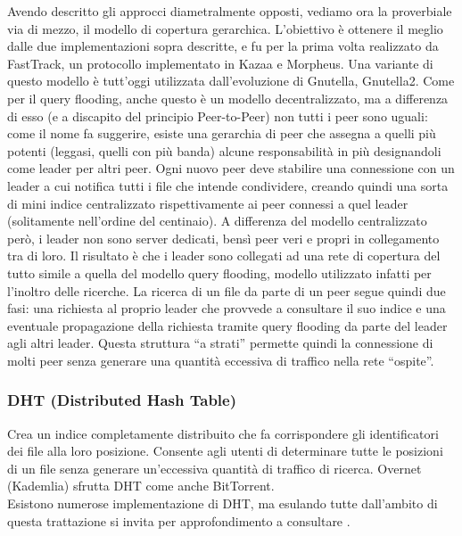 Avendo descritto gli approcci diametralmente opposti, vediamo ora la proverbiale via di mezzo, il modello di copertura gerarchica. L'obiettivo è ottenere il meglio dalle due implementazioni sopra descritte, e fu per la prima volta realizzato da FastTrack, un protocollo implementato in Kazaa e Morpheus. Una variante di questo modello è tutt'oggi utilizzata dall'evoluzione di Gnutella, Gnutella2. Come per il query flooding, anche questo è un modello decentralizzato, ma a differenza di esso (e a discapito del principio Peer-to-Peer) non tutti i peer sono uguali: come il nome fa suggerire, esiste una gerarchia di peer che assegna a quelli più potenti (leggasi, quelli con più banda) alcune responsabilità in più designandoli come leader per altri peer. Ogni nuovo peer deve stabilire una connessione con un leader a cui notifica tutti i file che intende condividere, creando quindi una sorta di mini indice centralizzato rispettivamente ai peer connessi a quel leader (solitamente nell'ordine del centinaio). A differenza del modello centralizzato però, i leader non sono server dedicati, bensì peer veri e propri in collegamento tra di loro. Il risultato è che i leader sono collegati ad una rete di copertura del tutto simile a quella del modello query flooding, modello utilizzato infatti per l'inoltro delle ricerche. La ricerca di un file da parte di un peer segue quindi due fasi: una richiesta al proprio leader che provvede a consultare il suo indice e una eventuale propagazione della richiesta tramite query flooding da parte del leader agli altri leader. Questa struttura ``a strati'' permette quindi la connessione di molti peer senza generare una quantità eccessiva di traffico nella rete ``ospite''.

\subsubsection{DHT (Distributed Hash Table)}\label{dht-distributed-hash-table}

Crea un indice completamente distribuito che fa corrispondere gli identificatori dei file alla loro posizione. Consente agli utenti di determinare tutte le posizioni di un file senza generare un'eccessiva quantità di traffico di ricerca. Overnet (Kademlia) sfrutta DHT come anche BitTorrent.\\
Esistono numerose implementazione di DHT, ma esulando tutte dall'ambito di questa trattazione si invita per approfondimento a consultare \cite{distributed-computing}.
